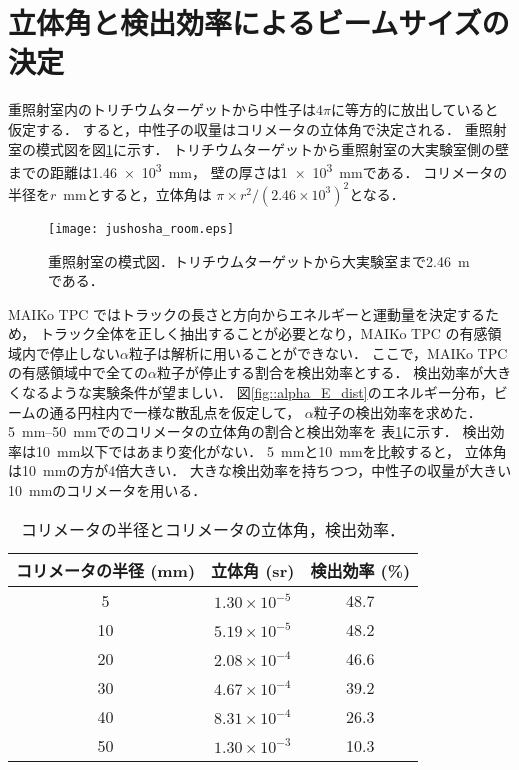 \documentclass[../master]{subfiles}
\begin{document}
\section{立体角と検出効率によるビームサイズの決定}
重照射室内のトリチウムターゲットから中性子は$4\pi$に等方的に放出していると仮定する．
すると，中性子の収量はコリメータの立体角で決定される．
重照射室の模式図を図\ref{fig::jushosha_room}に示す．
トリチウムターゲットから重照射室の大実験室側の壁までの距離は\SI{1.46e3}{\milli\metre}，
壁の厚さは\SI{1e3}{\milli\metre}である．
コリメータの半径を$r$~\si{\milli\metre}とすると，立体角は
$\pi\times r^2/\left(2.46\times10^3\right)^2$となる．
\begin{figure}
  \centering
  \texttt{[image: jushosha\_room.eps]}
  \caption{重照射室の模式図．トリチウムターゲットから大実験室まで\SI{2.46}{\metre}である．}
  \label{fig::jushosha_room}
\end{figure}

MAIKo TPC ではトラックの長さと方向からエネルギーと運動量を決定するため，
トラック全体を正しく抽出することが必要となり，MAIKo TPC の有感領域内で停止しない$\alpha$粒子は解析に用いることができない．
ここで，MAIKo TPC の有感領域中で全ての$\alpha$粒子が停止する割合を検出効率とする．
検出効率が大きくなるような実験条件が望ましい．
図\ref{fig::alpha_E_dist}のエネルギー分布，ビームの通る円柱内で一様な散乱点を仮定して，
$\alpha$粒子の検出効率を求めた．
\SIrange{5}{50}{\milli\metre}でのコリメータの立体角の割合と検出効率を
表\ref{tab::solid_angle_percent}に示す．
検出効率は\SI{10}{\milli\metre}以下ではあまり変化がない．
\SI{5}{\milli\metre}と\SI{10}{\milli\metre}を比較すると，
立体角は\SI{10}{\milli\metre}の方が4倍大きい．
大きな検出効率を持ちつつ，中性子の収量が大きい\SI{10}{\milli\metre}のコリメータを用いる．
\begin{table}
  \centering
  \caption{コリメータの半径とコリメータの立体角，検出効率．}
  \label{tab::solid_angle_percent}
  \begin{tabular}{ccc}
    \toprule
    コリメータの半径 (\si{\milli\metre}) & 立体角 (\si{\steradian}) & 検出効率 (\si{\percent})\\%
    \midrule
     5 & $1.30\times10^{-5}$ & 48.7 \\%
    10 & $5.19\times10^{-5}$ & 48.2 \\%
    20 & $2.08\times10^{-4}$ & 46.6 \\%
    30 & $4.67\times10^{-4}$ & 39.2 \\%
    40 & $8.31\times10^{-4}$ & 26.3 \\%
    50 & $1.30\times10^{-3}$ & 10.3 \\%
    \bottomrule
  \end{tabular}
\end{table}
\end{document}
